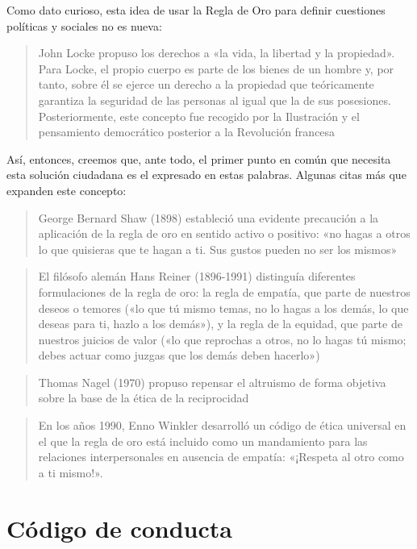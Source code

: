 \documentclass[
]{book}
\begin{document}
Como dato curioso, esta idea de usar la Regla de Oro para definir cuestiones políticas y sociales no es nueva:

\begin{quote}
John Locke propuso los derechos a «la vida, la libertad y la propiedad». Para Locke, el propio cuerpo es parte de los bienes de un hombre y, por tanto, sobre él se ejerce un derecho a la propiedad que teóricamente garantiza la seguridad de las personas al igual que la de sus posesiones. Posteriormente, este concepto fue recogido por la Ilustración y el pensamiento democrático posterior a la Revolución francesa
\end{quote}

Así, entonces, creemos que, ante todo, el primer punto en común que necesita esta solución ciudadana es el expresado en estas palabras. Algunas citas más que expanden este concepto:

\begin{quote}
George Bernard Shaw (1898) estableció una evidente precaución a la aplicación de la regla de oro en sentido activo o positivo: «no hagas a otros lo que quisieras que te hagan a ti. Sus gustos pueden no ser los mismos»
\end{quote}

\begin{quote}
El filósofo alemán Hans Reiner (1896-1991) distinguía diferentes formulaciones de la regla de oro: la regla de empatía, que parte de nuestros deseos o temores («lo que tú mismo temas, no lo hagas a los demás, lo que deseas para ti, hazlo a los demás»), y la regla de la equidad, que parte de nuestros juicios de valor («lo que reprochas a otros, no lo hagas tú mismo; debes actuar como juzgas que los demás deben hacerlo»)
\end{quote}

\begin{quote}
Thomas Nagel (1970) propuso repensar el altruismo de forma objetiva sobre la base de la ética de la reciprocidad
\end{quote}

\begin{quote}
En los años 1990, Enno Winkler desarrolló un código de ética universal en el que la regla de oro está incluido como un mandamiento para las relaciones interpersonales en ausencia de empatía: «¡Respeta al otro como a ti mismo!».
\end{quote}

\hypertarget{appendix-apuxe9ndice}{%
\appendix}


\hypertarget{codigo-de-conducta}{%
\chapter{Código de conducta}\label{codigo-de-conducta}}
\end{document}
